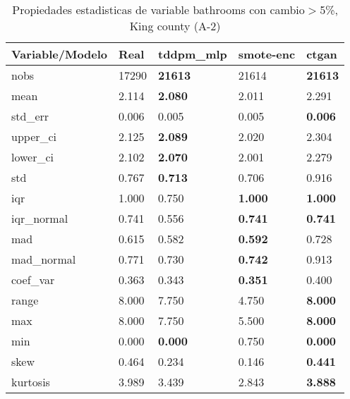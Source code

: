 \begin{table}[H]
\centering
\fontsize{8}{14}\selectfont
\caption{Propiedades estadisticas de variable bathrooms con cambio\ensuremath{>}5\%, King county (A-2)}
\label{table-stats-king county-a-2-bathrooms-short}
\begin{tabular}{|l|m{10em}|m{10em}|m{10em}|m{10em}|}
\hline
 \rowcolor[gray]{0.8}
Variable/Modelo & Real & tddpm\_mlp & smote-enc & ctgan \\
\hline nobs & 17290 & \bfseries 21613 & \cellcolor[rgb]{0.9, 0.54, 0.52} 21614 & \bfseries 21613 \\
\hline mean & 2.114 & \bfseries 2.080 & 2.011 & \cellcolor[rgb]{0.9, 0.54, 0.52} 2.291 \\
\hline std\_err & 0.006 & 0.005 & \cellcolor[rgb]{0.9, 0.54, 0.52} 0.005 & \bfseries 0.006 \\
\hline upper\_ci & 2.125 & \bfseries 2.089 & 2.020 & \cellcolor[rgb]{0.9, 0.54, 0.52} 2.304 \\
\hline lower\_ci & 2.102 & \bfseries 2.070 & 2.001 & \cellcolor[rgb]{0.9, 0.54, 0.52} 2.279 \\
\hline std & 0.767 & \bfseries 0.713 & 0.706 & \cellcolor[rgb]{0.9, 0.54, 0.52} 0.916 \\
\hline iqr & 1.000 & \cellcolor[rgb]{0.9, 0.54, 0.52} 0.750 & \bfseries 1.000 & \bfseries 1.000 \\
\hline iqr\_normal & 0.741 & \cellcolor[rgb]{0.9, 0.54, 0.52} 0.556 & \bfseries 0.741 & \bfseries 0.741 \\
\hline mad & 0.615 & 0.582 & \bfseries 0.592 & \cellcolor[rgb]{0.9, 0.54, 0.52} 0.728 \\
\hline mad\_normal & 0.771 & 0.730 & \bfseries 0.742 & \cellcolor[rgb]{0.9, 0.54, 0.52} 0.913 \\
\hline coef\_var & 0.363 & 0.343 & \bfseries 0.351 & \cellcolor[rgb]{0.9, 0.54, 0.52} 0.400 \\
\hline range & 8.000 & 7.750 & \cellcolor[rgb]{0.9, 0.54, 0.52} 4.750 & \bfseries 8.000 \\
\hline max & 8.000 & 7.750 & \cellcolor[rgb]{0.9, 0.54, 0.52} 5.500 & \bfseries 8.000 \\
\hline min & 0.000 & \bfseries 0.000 & \cellcolor[rgb]{0.9, 0.54, 0.52} 0.750 & \bfseries 0.000 \\
\hline skew & 0.464 & 0.234 & \cellcolor[rgb]{0.9, 0.54, 0.52} 0.146 & \bfseries 0.441 \\
\hline kurtosis & 3.989 & 3.439 & \cellcolor[rgb]{0.9, 0.54, 0.52} 2.843 & \bfseries 3.888 \\

\end{tabular}
\end{table}
